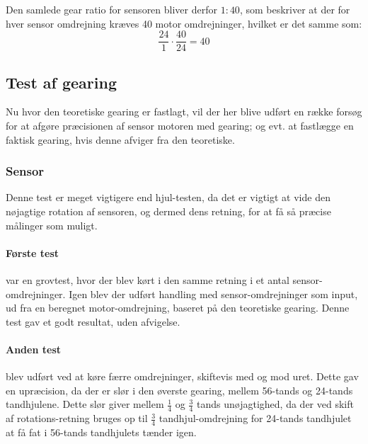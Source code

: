 Den samlede gear ratio for sensoren bliver derfor $1:40$, som beskriver at der for hver sensor omdrejning kræves 40 motor omdrejninger, hvilket er det samme som:
$$\frac{24}{1} \cdot \frac{40}{24} = 40$$

\subsection{Test af gearing}\label{robot:gearing-test}
Nu hvor den teoretiske gearing er fastlagt, vil der her blive udført en række forsøg for at afgøre præcisionen af sensor motoren med gearing; og evt. at fastlægge en faktisk gearing, hvis denne afviger fra den teoretiske.

\subsubsection{Sensor}
Denne test er meget vigtigere end hjul-testen, da det er vigtigt at vide den nøjagtige rotation af sensoren, og dermed dens retning, for at få så præcise målinger som muligt.

\paragraph{Første test} var en grovtest, hvor der blev kørt i den samme retning i et antal sensor-omdrejninger.
Igen blev der udført handling med sensor-omdrejninger som input, ud fra en beregnet motor-omdrejning, baseret på den teoretiske gearing.
Denne test gav et godt resultat, uden afvigelse.

\paragraph{Anden test} blev udført ved at køre færre omdrejninger, skiftevis med og mod uret.
Dette gav en upræcision, da der er slør i den øverste gearing, mellem 56-tands og 24-tands tandhjulene.
Dette slør giver mellem $\frac{1}{4}$ og $\frac{3}{4}$ tands unøjagtighed, da der ved skift af rotations-retning bruges op til $\frac{3}{4}$ tandhjul-omdrejning for 24-tands tandhjulet at få fat i 56-tands tandhjulets tænder igen.
